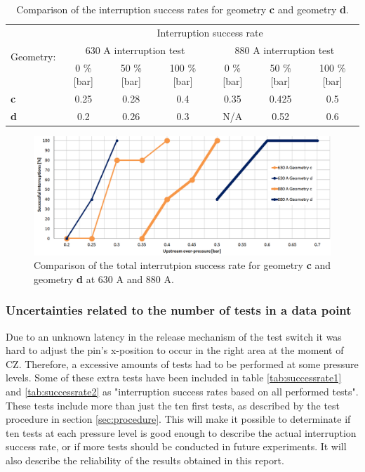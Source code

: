 \documentclass[10pt,b5paper,twoside]{article}
\begin{document}
\begin{table}[h]
\center
\caption{Comparison of the interruption success rates for geometry \textbf{c} and geometry \textbf{d}.}
\begin{tabular}{|l|c|c|c|c|c|c|}
\hline
\multirow{3}{*}{Geometry:} & \multicolumn{6}{|c|}{Interruption success rate}                                                           \\ \cline{2-7} 
                          & \multicolumn{3}{|c}{630 A interruption test}        & \multicolumn{3}{|c|}{880 A interruption test}       \\ \cline{2-7} 
                          & 0 \% {[}bar{]} & 50 \% {[}bar{]} & 100 \% {[}bar{]} & 0 \% {[}bar{]} & 50 \% {[}bar{]} & 100 \% {[}bar{]} \\ \hline
\textbf{c}                & 0.25           & 0.28            & 0.4              & 0.35            & 0.425            & 0.5              \\ \hline
\textbf{d}                & 0.2            & 0.26           & 0.3              & N/A           & 0.52            & 0.6              \\ \hline
\end{tabular}
\label{tab:compgeoCandD}
\end{table}

\begin{figure}[H]
\centering
\includegraphics[scale=0.5, angle =90 ]{Bilder/Results/compGeoCandDNew.PNG}
\caption{Comparison of the total interrutpion success rate for geometry \textbf{c} and geometry \textbf{d} at 630 A and 880 A.} \label{fig:compgeoCandDAllcurrents}
\end{figure}

\subsubsection{Uncertainties related to the number of tests in a data point}
Due to an unknown latency in the release mechanism of the test switch it was hard to adjust the pin's x-position to occur in the right area at the moment of CZ. Therefore, a excessive amounts of tests had to be performed at some pressure levels. Some of these extra tests have been included in table \ref{tab:successrate1} and \ref{tab:successrate2} as "interruption success rates based on all performed tests". These tests include more than just the ten first tests, as described by the test procedure in section \ref{sec:procedure}. This will make it possible to determinate if ten tests at each pressure level is good enough to describe the actual interruption success rate, or if more tests should be conducted in future experiments. It will also describe the reliability of the results obtained in this report.
\end{document}
